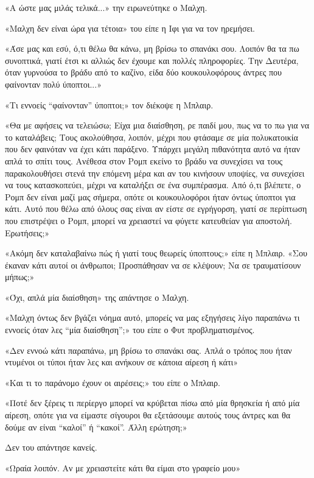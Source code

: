 \documentclass[12pt,twoside, openany]{book}
\begin{document}
«Α ώστε μας μιλάς τελικά...» την ειρωνεύτηκε ο Μαλχη.

«Μαλχη δεν είναι ώρα για τέτοια» του είπε η Ιφι για να τον ηρεμήσει.

«Άσε μας και εσύ, ό,τι θέλω θα κάνω, μη βρίσω το σπανάκι σου. Λοιπόν θα τα πω συνοπτικά, γιατί έτσι κι αλλιώς δεν έχουμε και πολλές πληροφορίες. Την Δευτέρα, όταν γυρνούσα το βράδυ από το καζίνο, είδα δύο κουκουλοφόρους άντρες που φαίνονταν πολύ ύποπτοι...»

«Τι εννοείς “φαίνονταν” ύποπτοι;» τον διέκοψε η Μπλαιρ.

«Θα με αφήσεις να τελειώσω; Είχα μια διαίσθηση, ρε παιδί μου, πως να το πω για να το καταλάβεις; Τους ακολούθησα, λοιπόν, μέχρι που φτάσαμε σε μία πολυκατοικία που δεν φαινόταν να έχει κάτι παράξενο. Υπάρχει μεγάλη πιθανότητα αυτό να ήταν απλά το σπίτι τους. Ανέθεσα στον Ρομπ εκείνο το βράδυ να συνεχίσει να τους παρακολουθήσει στενά την επόμενη μέρα και αν του κινήσουν υποψίες, να συνεχίσει να τους κατασκοπεύει, μέχρι να καταλήξει σε ένα συμπέρασμα. Από ό,τι βλέπετε, ο Ρομπ δεν είναι μαζί μας σήμερα, οπότε οι κουκουλοφόροι ήταν όντως ύποπτοι για κάτι. Αυτό που θέλω από όλους σας είναι αν είστε σε εγρήγορση, γιατί σε περίπτωση που επιστρέψει ο Ρομπ, μπορεί να χρειαστεί να φύγετε κατευθείαν για αποστολή. Ερωτήσεις;»

«Ακόμη δεν καταλαβαίνω πώς ή γιατί τους θεωρείς ύποπτους;» είπε η Μπλαιρ. «Σου έκαναν κάτι αυτοί οι άνθρωποι; Προσπάθησαν να σε κλέψουν; Να σε τραυματίσουν μήπως;»

«Όχι, απλά μία διαίσθηση» της απάντησε ο Μαλχη.

«Μαλχη όντως δεν βγάζει νόημα αυτό, μπορείς να μας εξηγήσεις λίγο παραπάνω τι εννοείς όταν λες “μία διαίσθηση”;» του είπε ο Φυτ προβληματισμένος.

«Δεν εννοώ κάτι παραπάνω, μη βρίσω το σπανάκι σας. Απλά ο τρόπος που ήταν ντυμένοι οι τύποι ήταν λες και ανήκουν σε κάποια αίρεση ή κάτι»

«Και τι το παράνομο έχουν οι αιρέσεις;» του είπε ο Μπλαιρ.

«Ποτέ δεν ξέρεις τι περίεργο μπορεί να κρύβεται πίσω από μία θρησκεία ή από μία αίρεση, οπότε για να είμαστε σίγουροι θα εξετάσουμε αυτούς τους άντρες και θα δούμε αν είναι “καλοί” ή “κακοί”. Άλλη ερώτηση;»

Δεν του απάντησε κανείς.

«Ωραία λοιπόν. Αν με χρειαστείτε κάτι θα είμαι στο γραφείο μου»

\chapter{}
\end{document}

